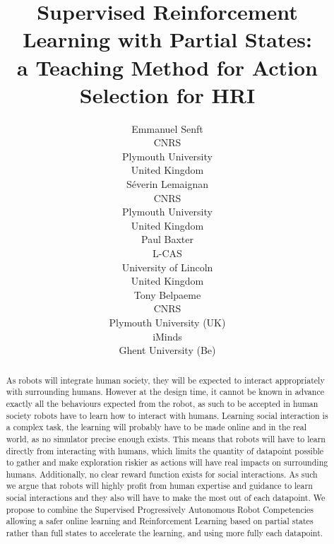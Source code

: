 \documentclass[letterpaper]{article} %
\begin{document}
%
\title{Supervised Reinforcement Learning with Partial States: \\
 a Teaching Method for Action Selection for HRI}

\author{Emmanuel Senft \\
CNRS \\
Plymouth University \\
United Kingdom\\
\And S\'{e}verin Lemaignan\\
CNRS \\
Plymouth University \\
United Kingdom\\
\And Paul Baxter\\
L-CAS\\
University of Lincoln\\
United Kingdom\\
 \And Tony Belpaeme\\
 CNRS\\ Plymouth University (UK) \\ iMinds \\ Ghent University (Be)}

\maketitle
\begin{abstract}
As robots will integrate human society, they will be expected to interact
appropriately with surrounding humans. However at the design time, it cannot be
known in advance exactly all the behaviours expected from the robot, as such to
be accepted in human society robots have to learn how to interact with humans.
Learning social interaction is a complex task, the learning will probably have
to be made online and in the real world, as no simulator precise enough exists.
This means that robots will have to learn directly from interacting with humans,
which limits the quantity of datapoint possible to gather and make exploration
riskier as actions will have real impacts on surrounding humans. Additionally,
no clear reward function exists for social interactions. As such we argue that
robots will highly profit from human expertise and guidance to learn social
interactions and they also will have to make the most out of each datapoint. We
propose to combine the Supervised Progressively Autonomous Robot Competencies
allowing a safer online learning and Reinforcement Learning based on partial
states rather than full states to accelerate the learning, and using more fully
each datapoint.
\end{abstract}
\end{document}
